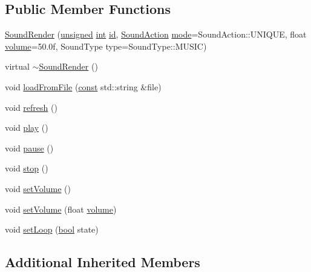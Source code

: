 \subsection*{Public Member Functions}
\begin{DoxyCompactItemize}
\item 
\hyperlink{classarcade_1_1_sound_render_a615a63e0d5615dc9148c3be556ff90de}{Sound\-Render} (\hyperlink{curses_8priv_8h_aca40206900cfc164654362fa8d4ad1e6}{unsigned} \hyperlink{term__entry_8h_ad65b480f8c8270356b45a9890f6499ae}{int} \hyperlink{structarcade_1_1_sound_a9bee48a44860d44ddb963621ceb9172b}{id}, \hyperlink{namespacearcade_a31ef30225775697d1aeaf59819ac5051}{Sound\-Action} \hyperlink{structarcade_1_1_sound_a67fc0884cb4d9445ad6c9d9a241a15ef}{mode}=Sound\-Action\-::\-U\-N\-I\-Q\-U\-E, float \hyperlink{structarcade_1_1_sound_aa80e8832313b76cefcf2e866c4a2e1cc}{volume}=50.\-0f, Sound\-Type type=\-Sound\-Type\-::\-M\-U\-S\-I\-C)
\item 
virtual \hyperlink{classarcade_1_1_sound_render_a6b7dd27ef7b422151445aa497ef55e93}{$\sim$\-Sound\-Render} ()
\item 
void \hyperlink{classarcade_1_1_sound_render_a1ad5df4a48684deb7d823ca995d16b88}{load\-From\-File} (\hyperlink{term__entry_8h_a57bd63ce7f9a353488880e3de6692d5a}{const} std\-::string \&file)
\item 
void \hyperlink{classarcade_1_1_sound_render_a28513a1a7fc13be74de3b84c41ad1220}{refresh} ()
\item 
void \hyperlink{classarcade_1_1_sound_render_a3242d9008d606e9129180309df7b058a}{play} ()
\item 
void \hyperlink{classarcade_1_1_sound_render_a327bcd9f43f0cb72c5f20d112689ce4f}{pause} ()
\item 
void \hyperlink{classarcade_1_1_sound_render_ac43d9a7cde02be60dda3e396186e26f2}{stop} ()
\item 
void \hyperlink{classarcade_1_1_sound_render_a928a37b14b5145ed4c4d25e6a7cc6329}{set\-Volume} ()
\item 
void \hyperlink{classarcade_1_1_sound_render_a2471f93998f152d3091b24df00da4a24}{set\-Volume} (float \hyperlink{structarcade_1_1_sound_aa80e8832313b76cefcf2e866c4a2e1cc}{volume})
\item 
void \hyperlink{classarcade_1_1_sound_render_ac56113c472d0cd4e0463d33b95e69eee}{set\-Loop} (\hyperlink{term__entry_8h_a002004ba5d663f149f6c38064926abac}{bool} state)
\end{DoxyCompactItemize}
\subsection*{Additional Inherited Members}


